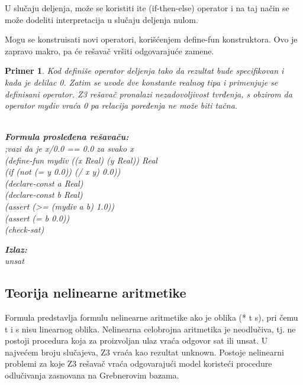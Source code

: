 \documentclass[12pt,oneside]{memoir}
\newcommand\tab[1][0.5cm]{\hspace*{#1}}
\newtheorem{primer}{Primer}
\begin{document}
U slučaju deljenja, može se koristiti ite (if-then-else) operator i na taj način se može dodeliti interpretacija u slučaju deljenja nulom.
\par
Mogu se konstruisati novi operatori, korišćenjem define-fun konstruktora. Ovo je zapravo makro, pa će rešavač vršiti odgovarajuće zamene.
\begin{primer} Kod definiše operator deljenja tako da rezultat bude specifikovan i kada je delilac 0. Zatim se uvode dve konstante realnog tipa i primenjuje se definisani operator. Z3 rešavač pronalazi nezadovoljivost tvrđenja, s obzirom da operator mydiv vraća 0 pa relacija poređenja ne može biti tačna.\\ \\
\begin{minipage}[b]{0.5\textwidth}
\textbf{Formula prosleđena rešavaču:}
\\;vazi da je x/0.0 == 0.0 za svako x
\\(define-fun mydiv ((x Real) (y Real)) Real
\\\tab (if (not (= y 0.0))  (/ x y)  0.0))
\\(declare-const a Real)
\\(declare-const b Real)
\\(assert (>= (mydiv a b) 1.0))
\\(assert (= b 0.0))
\\(check-sat)

\end{minipage}
\hspace{3cm}
\begin{minipage}[t]{0.4\textwidth}
\vspace{-5.3cm}
\textbf{Izlaz:}
\\unsat
\end{minipage}
\end{primer}

\subsection{Teorija nelinearne aritmetike} 

Formula predstavlja formulu nelinearne aritmetike ako je oblika (* t s), pri čemu t i s nisu linearnog oblika.
Nelinearna celobrojna aritmetika je neodlučiva, tj. ne postoji procedura koja za proizvoljan ulaz vraća odgovor sat ili unsat. U najvećem broju slučajeva, Z3 vraća kao rezultat unknown. Postoje nelinearni problemi za koje Z3 rešavač vraća odgovarajući model koristeći procedure odlučivanja zasnovana na Grebnerovim bazama.
\end{document}
